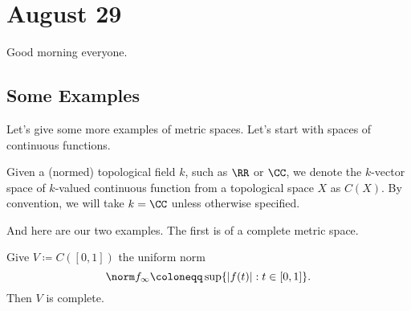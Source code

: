 \documentclass[../notes.tex]{subfiles}
\begin{document}
\section{August 29}

Good morning everyone.

\subsection{Some Examples}
Let's give some more examples of metric spaces. Let's start with spaces of continuous functions.
\begin{definition}
	Given a (normed) topological field $k$, such as $\RR$ or $\CC$, we denote the $k$-vector space of $k$-valued continuous function from a topological space $X$ as $C(X)$. By convention, we will take $k=\CC$ unless otherwise specified.
\end{definition}
And here are our two examples. The first is of a complete metric space.
\begin{exe}
	Give $V\coloneqq C([0,1])$ the uniform norm
	\[\norm f_\infty\coloneqq\sup\{|f(t)|:t\in[0,1]\}.\]
	Then $V$ is complete.
\end{exe}
\end{document}
